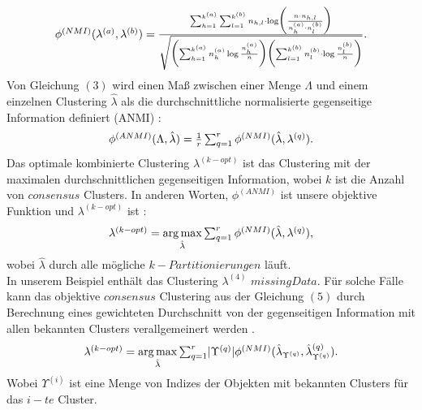 \documentclass[runningheads]{llncs}
\begin{document}
\begin{equation}
\centerline{$\phi^{(NMI)}(\lambda^{(a)}, \lambda^{(b)}) = \frac{\sum_{h=1}^{k^{(a)}} \sum_{l=1}^{k^{(b)}}n_{h,l} \cdot \log \biggl(\frac{n \cdot n_{h,l}}{n_{h}^{(a)} \cdot n_{l}^{(b)}} \biggr) }{\sqrt{\biggl(\sum_{h=1}^{k^{(a)}} n_{h}^{(a)} \log \frac{n_{h}^{(a)}}{n} \biggr)
			\biggl(\sum_{l=1}^{k^{(b)}} n_{l}^{(b)} \cdot \log \frac{n_{l}^{(b)}}{n} \biggr)}}.$}
\end{equation}
Von Gleichung $(3)$ wird einen Maß zwischen einer Menge $\Lambda$ und einem einzelnen Clustering $\hat{\lambda}$  als die durchschnittliche normalisierte gegenseitige Information definiert (ANMI) \cite{strehl2002cluster}: 
\begin{equation} 
	\centerline{$\phi^{(ANMI)}(\Lambda, \hat{\lambda}) = \frac{1}{r} \sum_{q=1}^{r} \phi^{(NMI)}(\hat{\lambda}, \lambda^{(q)}).$}
\end{equation}
Das optimale kombinierte Clustering $\lambda^{(k-opt)}$ ist das Clustering mit der maximalen durchschnittlichen gegenseitigen Information, wobei $k$ ist die Anzahl von $consensus$ Clusters. In anderen Worten, $\phi^{(ANMI)}$ ist unsere objektive Funktion und $\lambda^{(k-opt)}$ ist \cite{strehl2002cluster}:
\begin{equation} 
	\centerline{$\lambda^{(k-opt)} = \underset{\hat{\lambda}}{\arg\max} \sum_{q=1}^{r} \phi^{(NMI)}(\hat{\lambda}, \lambda^{(q)}),$}
\end{equation}
wobei $\hat{\lambda}$ durch alle mögliche $k-Partitionierungen$ läuft. \\  
In unserem Beispiel enthält das Clustering $\lambda^{(4)}$ $missing Data$. Für solche Fälle kann das objektive $consensus$ Clustering aus der Gleichung $(5)$ durch Berechnung eines gewichteten Durchschnitt von der gegenseitigen Information mit allen bekannten Clusters verallgemeinert werden \cite{strehl2002cluster}.   
\begin{equation} 
	\centerline{$\lambda^{(k-opt)} = \underset{\hat{\lambda}}{\arg\max} \sum_{q=1}^{r} \lvert \Upsilon^{(q)} \lvert \phi^{(NMI)}(\hat{\lambda}_{\Upsilon^{(q)}}, \hat{\lambda}_{\Upsilon^{(q)}}^{(q)}).$}
\end{equation}
Wobei $\Upsilon^{(i)}$ ist eine Menge von Indizes der Objekten mit bekannten Clusters für das $i-te$ Cluster. 
\end{document}
